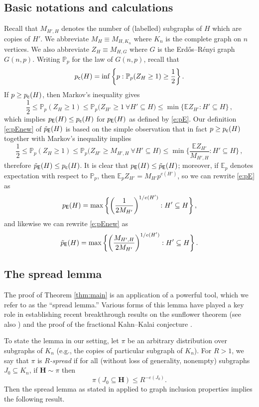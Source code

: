 \documentclass[11pt,reqno]{amsart}
\theoremstyle{plain}
\theoremstyle{definition}
\theoremstyle{remark}
\newcommand{\E}{\mathbb{E}}
\newcommand{\PP}{\mathbb{P}}
\newcommand{\beq}{\begin{equation}}
\newcommand{\eeq}{\end{equation}}
\begin{document}
\subsection{Basic notations and calculations}
\label{ss:basicobs}
 Recall that $M_{H',H}$ denotes the number of (labelled) subgraphs of $H$ which are copies of $H'$. We abbreviate $M_H\equiv M_{H,K_n}$ where $K_n$ is the complete graph on $n$ vertices. We also abbreviate $Z_H\equiv M_{H,G}$ where $G$ is the Erd\H{o}s--R\'enyi graph $G(n,p)$. Writing $\PP_p$ for the law of $G(n,p)$, recall that
	\[
	\pcrit(H)
	= \inf\bigg\{ p : \PP_p(Z_H\ge1) \ge \frac12\bigg\}\,.
	\]
If $p \ge p_\mathsf{c}(H)$, then Markov's inequality gives
	\[
	\frac12 \le \PP_p(Z_H\ge1) \le \PP_p\Big(Z_{H'}\ge1
		\ \forall H' \subseteq H\Big)
	\le \min\bigg\{ \E Z_{H'} : H'\subseteq H\bigg\}
	\,,
	\]
which implies $p_\mathsf{E}(H) \le p_\mathsf{c}(H)$ for $p_\mathsf{E}(H)$ as defined by \eqref{e:pE}. Our definition \eqref{e:pEnew} of $\tilde{p}_\mathsf{E}(H)$ is based on the simple observation that in fact $p \ge p_\mathsf{c}(H)$ together with Markov's inequality implies
	\[
	\frac12 \le \PP_p(Z_H\ge1) \le \PP_p\Big(Z_{H'}\ge M_{H',H}
		\ \forall H' \subseteq H\Big)
	\le \min\bigg\{ \frac{\E Z_{H'}}{M_{H',H}}
	 : H'\subseteq H\bigg\}
	\,,
	\]
therefore $\tilde{p}_\mathsf{E}(H) \le p_\mathsf{c}(H)$. 
It is clear that
$p_\mathsf{E}(H) \le\tilde{p}_\mathsf{E}(H)$; moreover, if $\E_p$ denotes expectation with respect to $\PP_p$, then
 $\E_p Z_{H'} = M_{H'} p^{e(H')}$, so we can rewrite
 \eqref{e:pE} as
 	\[
	p_\mathsf{E}(H)
	= \max\bigg\{
	\bigg(\frac{1}{2M_{H'}}\bigg)^{1/e(H')}
	: H'\subseteq H\bigg\}\,,
	\]
and likewise we can rewrite \eqref{e:pEnew} as
	\beq\label{e:gen.first.mmt.threshold}
	\pEnew(H)
	= \max\bigg\{
	\bigg(\frac{M_{H',H}}{2M_{H'}}\bigg)^{1/e(H')}
	: H'\subseteq H\bigg\}\,.
	\eeq


\subsection{The spread lemma} 
The proof of Theorem \ref{thm:main} is an application of a powerful tool, which we refer to as the ``spread lemma.'' Various forms of this lemma have played a key role in establishing recent breakthrough results on the sunflower theorem \cite{sunflower_annals} (see also \cite{Rao_sunflower, Tao_sunflower}) and the proof of the {fractional Kahn--Kalai conjecture}  \cite{fracKK_annals}.

To state the lemma in our setting, let $\pi$ be an arbitrary distribution over subgraphs of $K_n$ (e.g., the copies of particular subgraph of $K_n$). For $R>1$, we say that $\pi$ is \textit{$R$-spread} if for all (without loss of generality, nonempty) subgraphs $J_0\subseteq K_n$,  if $\bm{H}\sim\pi$ then
\beq\label{spread_cond}
\pi(J_0 \subseteq \bm{H}) \leq R^{-e(J_0)}.
\eeq
 Then the spread lemma as stated in \cite[Theorem 1.6]{fracKK_annals} applied to graph inclusion properties implies the following result.
\end{document}
